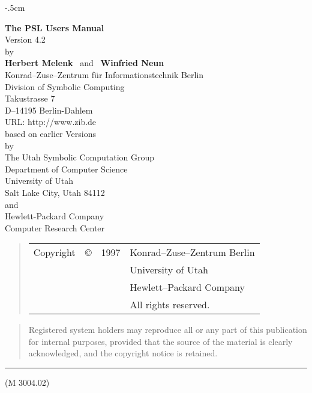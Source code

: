 \hoffset -.5cm
\voffset 2cm
\parindent=0pt
\addtolength{\topmargin}{-2cm}
\addtolength{\textheight}{1cm}
%
\thispagestyle{empty}
\begin{center}
{\Large \bf The PSL Users Manual}\\[.5cm]
{\large Version 4.2}\\[1.0cm]
by \\[1.0cm]
{\bf Herbert Melenk} \  and \ {\bf Winfried Neun} \\[.5cm] 
{\normalsize
Konrad--Zuse--Zentrum f\"ur Informationstechnik Berlin\\
Division of Symbolic Computing\\
Takustrasse 7\\
D--14195 Berlin-Dahlem\\[0.5cm]
URL: http://www.zib.de\\[1.1cm]
based on earlier Versions\\[.5cm]
by\\[.5cm]
The Utah Symbolic Computation Group\\
Department of Computer Science\\
University of Utah\\
Salt Lake City, Utah 84112\\[.5cm]
and\\[.5cm]
Hewlett-Packard Company\\
Computer Research Center}
\end{center}
\begin{quote}
{\footnotesize
\begin{tabular}{llll}
Copyright & \copyright & 1997 & Konrad--Zuse--Zentrum Berlin \\
& & & University of Utah \\
& & & Hewlett--Packard Company \\
& & & All rights reserved.
\end{tabular}
}
\end{quote}
\vspace*{.5cm}
\begin{quote}
{\footnotesize Registered system holders may reproduce all or any part of
this publication for internal purposes, provided that the source of the
material is clearly acknowledged, and the copyright notice is retained.}
\end{quote}
\hrule
\vspace*{3mm}
(M 3004.02)

